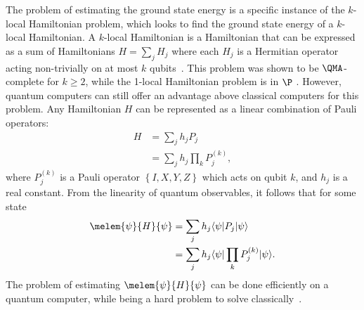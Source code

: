 The problem of estimating the ground state energy is a specific instance of the $k$-local Hamiltonian problem, which looks to find the ground state energy of a $k$-local Hamiltonian.
A $k$-local Hamiltonian is a Hamiltonian that can be expressed as a sum of Hamiltonians $H = \sum_{j}H_j$ where each $H_j$ is a Hermitian operator acting non-trivially on at most $k$ qubits~\cite{bookatz2012qma}.
This problem was shown to be $\QMA$-complete for $k \geq 2$, while the 1-local Hamiltonian problem is in $\P$ \cite{kempe2006complexity}.
However, quantum computers can still offer an advantage above classical computers for this problem.
Any Hamiltonian $H$ can be represented as a linear combination of Pauli operators:
\begin{align} \label{eq:pauli_hamiltonian}
H &= \sum_j h_j P_j \\
  &= \sum_j h_j \prod_k P_j^{(k)},
\end{align} 
where $P_j^{(k)}$ is a Pauli operator $\left\{I, X, Y, Z\right\}$ which acts on qubit $k$, and $h_j$ is a real constant.
From the linearity of quantum observables, it follows that for some state \ket{\psi}
\begin{align}
\melem{\psi}{H}{\psi} &= \sum_j h_j \bra{\psi}P_j\ket{\psi} \\
&= \sum_j h_j \bra{\psi}\prod_k P_j^{(k)}\ket{\psi}.
\end{align} 
The problem of estimating $\melem{\psi}{H}{\psi}$ can be done efficiently on a quantum computer, while being a hard problem to solve classically~\cite{ortiz2001quantum, peruzzo2014variational, kandala2017hardware}.

